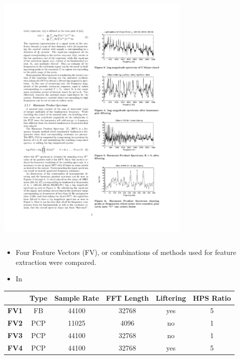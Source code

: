 \documentclass{beamer}
\begin{document}
\begin{frame}
\begin{columns}
\begin{column}{.5\textwidth}
	\includegraphics[width=0.70\textwidth]{freq3.pdf}
	\end{column}
	\end{columns}
\end{frame}

\begin{frame}
	 \begin{itemize}
 	\item Four Feature Vectors (FV), or combinations of methods used for feature extraction were compared.
 	\item In
 \end{itemize}
 
	\begin{table}
\centering
\begin{tabular}{|c|c|c|c|c|c|} \hline
 & \textbf{Type} & \textbf{Sample Rate} & \textbf{FFT Length} & \textbf{Liftering} & \textbf{HPS Ratio} \\ \hline
\textbf{FV1} & FB & 44100 & 32768 & yes & 5 \\ \hline
\textbf{FV2} & PCP & 11025 & 4096 & no & 1 \\ \hline
\textbf{FV3} & PCP & 44100 & 32768 & no & 1 \\ \hline
\textbf{FV4} & PCP & 44100 & 32768 & yes & 5 \\ \hline
\end{tabular}
\label{tab:tab2}
\end{table} 
\end{frame}
\end{document}
